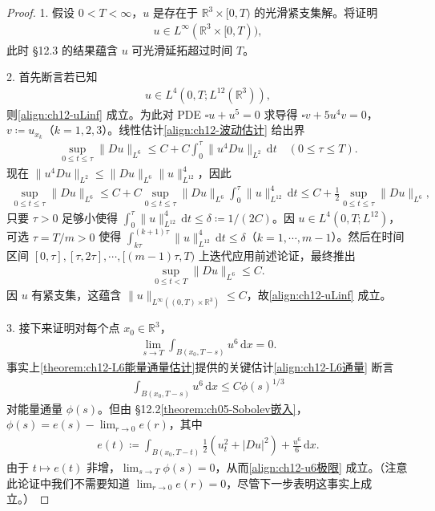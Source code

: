 \documentclass[../../main.tex]{subfiles}
\begin{document}
\begin{proof}
1. 假设 $0<T<\infty$，$u$ 是存在于 $\mathbb{R}^3\times[0,T)$ 的光滑紧支集解。将证明
\begin{align}
u\in L^\infty(\mathbb{R}^3\times[0,T)),
\label{align:ch12-uLinf}
\end{align}
此时 \S12.3 的结果蕴含 $u$ 可光滑延拓超过时间 $T$。

2. 首先断言若已知
\begin{align}
u\in L^4(0,T;L^{12}(\mathbb{R}^3)),
\label{align:ch12-uL4}
\end{align}
则\eqref{align:ch12-uLinf} 成立。为此对 PDE $\square u+u^5=0$ 求导得 $\square v+5u^4v=0$，$v\coloneqq u_{x_k}$（$k=1,2,3$）。线性估计\eqref{align:ch12-波动估计} 给出界
\begin{align*}
\sup_{0\leqslant t\leqslant\tau}\|Du\|_{L^6}\leqslant C+C\int_0^\tau\|u^4Du\|_{L^2}\,\mathrm{d}t \quad (0\leqslant\tau\leqslant T).
\end{align*}
现在 $\|u^4Du\|_{L^2}\leqslant\|Du\|_{L^6}\|u\|_{L^{12}}^4$，因此
\begin{align*}
\sup_{0\leqslant t\leqslant\tau}\|Du\|_{L^6}\leqslant C+C\sup_{0\leqslant t\leqslant\tau}\|Du\|_{L^6}\int_0^\tau\|u\|_{L^{12}}^4\,\mathrm{d}t\leqslant C+\frac{1}{2}\sup_{0\leqslant t\leqslant\tau}\|Du\|_{L^6},
\end{align*}
只要 $\tau>0$ 足够小使得 $\int_0^\tau\|u\|_{L^{12}}^4\,\mathrm{d}t\leqslant\delta\coloneqq 1/(2C)$。因 $u\in L^4(0,T;L^{12})$，可选 $\tau=T/m>0$ 使得 $\int_{k\tau}^{(k+1)\tau}\|u\|_{L^{12}}^4\,\mathrm{d}t\leqslant\delta$（$k=1,\cdots,m-1$）。然后在时间区间 $[0,\tau],[\tau,2\tau],\cdots,[(m-1)\tau,T)$ 上迭代应用前述论证，最终推出
\begin{align*}
\sup_{0\leqslant t<T}\|Du\|_{L^6}\leqslant C.
\end{align*}
因 $u$ 有紧支集，这蕴含 $\|u\|_{L^\infty((0,T)\times\mathbb{R}^3)}\leqslant C$，故\eqref{align:ch12-uLinf} 成立。

3. 接下来证明对每个点 $x_0\in\mathbb{R}^3$，
\begin{align}
\lim_{s\to T}\int_{B(x_0,T-s)}u^6\,\mathrm{d}x=0.
\label{align:ch12-u6极限}
\end{align}
事实上\cref{theorem:ch12-L6能量通量估计}提供的关键估计\eqref{align:ch12-L6通量} 断言
\begin{align*}
\int_{B(x_0,T-s)}u^6\,\mathrm{d}x\leqslant C\phi(s)^{1/3}
\end{align*}
对能量通量 $\phi(s)$。但由 \S12.2\cref{theorem:ch05-Sobolev嵌入}，$\phi(s)=e(s)-\lim_{r\to 0}e(r)$，其中
\begin{align*}
e(t)\coloneqq\int_{B(x_0,T-t)}\frac{1}{2}(u_t^2+|Du|^2)+\frac{u^6}{6}\,\mathrm{d}x.
\end{align*}
由于 $t\mapsto e(t)$ 非增，$\lim_{s\to T}\phi(s)=0$，从而\eqref{align:ch12-u6极限} 成立。（注意此论证中我们不需要知道 $\lim_{r\to 0}e(r)=0$，尽管下一步表明这事实上成立。）


\end{proof}
\end{document}
